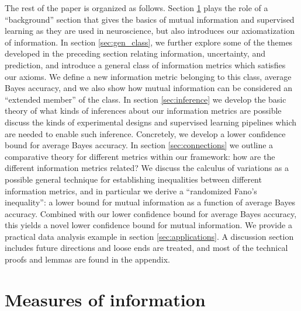 \documentclass[12pt]{article}
\begin{document}
The rest of the paper is organized as follows.  Section \ref{sec:info}
plays the role of a ``background'' section that gives the basics of
mutual information and supervised learning as they are used in
neuroscience, but also introduces our axiomatization of information.
In section \ref{sec:gen_class}, we further explore some of the themes
developed in the preceding section relating information, uncertainty,
and prediction, and introduce a general class of information metrics
which satisfies our axioms.  We define a new information metric
belonging to this class, average Bayes accuracy, and we also show how
mutual information can be considered an ``extended member'' of the
class.  In section \ref{sec:inference} we develop the basic theory of
what kinds of inferences about our information metrics are possible
discuss the kinds of experimental designs and supervised learning
pipelines which are needed to enable such inference.  Concretely, we
develop a lower confidence bound for average Bayes accuracy. In
section \ref{sec:connections} we outline a comparative theory for
different metrics within our framework: how are the different
information metrics related?  We discuss the calculus of variations as
a possible general technique for establishing inequalities between
different information metrics, and in particular we derive a
``randomized Fano's inequality'': a lower bound for mutual information
as a function of average Bayes accuracy.  Combined with our lower
confidence bound for average Bayes accuracy, this yields a novel lower
confidence bound for mutual information.  We provide a practical data
analysis example in section \ref{sec:applications}.  A discussion
section includes future directions and loose ends are treated, and
most of the technical proofs and lemmas are found in the appendix.

\section{Measures of information}\label{sec:info}
\end{document}
